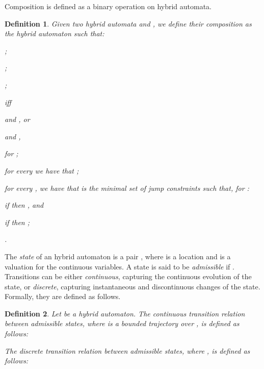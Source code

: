 \documentclass[submission,copyright,creativecommons]{eptcs}
\newtheorem{definition}{Definition}
\begin{document}
Composition is defined as a binary operation on hybrid automata. 

\begin{definition}\label{def:ha-composition}
	Given two hybrid automata  and \linebreak , we define their composition  as the hybrid automaton  such that:
\begin{compactenum}
	\item ;

	\item ;

	\item ;

	\item  iff
		\begin{inparaenum}[\it (i)]
			\item  and , or
			\item  and ,
		\end{inparaenum}
		for ;

	\item 	for every  we have that ;


	\item for every , we have that  is 
		the minimal set of jump constraints such that, for :
		\begin{compactenum}[\it (i)]
			\item if  then , and
			\item if  then ;
		\end{compactenum}
	\item .
\end{compactenum}
\end{definition}


The \emph{state} of an hybrid automaton  is a pair , where 
is a location and  is a valuation for the continuous variables.
A state  is said to be \emph{admissible} if .
Transitions can be either \emph{continuous}, capturing the continuous evolution of the state, or 
\emph{discrete}, capturing instantaneous and discontinuous changes of the state.
Formally, they are defined as follows.

\begin{definition}\label{def:ha-semantics}
Let  be a hybrid automaton.
The \emph{continuous transition relation}  between admissible states, 
where  is a bounded trajectory over , is
defined as follows:

The \emph{discrete transition relation}  between admissible states, where
, is defined as follows:

\end{definition}
\end{document}
